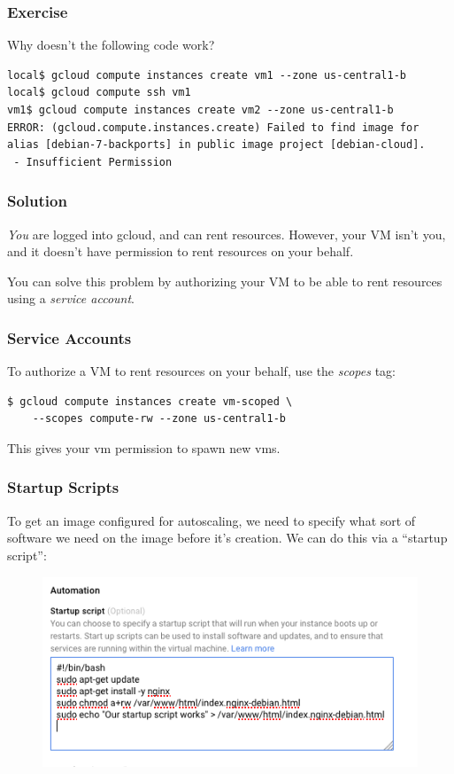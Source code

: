 \documentclass[9pt]{beamer}
\begin{document}
\begin{frame}[fragile]
\frametitle{Exercise}
Why doesn't the following code work?
\begin{verbatim}
local$ gcloud compute instances create vm1 --zone us-central1-b
local$ gcloud compute ssh vm1
vm1$ gcloud compute instances create vm2 --zone us-central1-b
ERROR: (gcloud.compute.instances.create) Failed to find image for alias [debian-7-backports] in public image project [debian-cloud].
 - Insufficient Permission
\end{verbatim}
\end{frame}

\begin{frame}[fragile]
\frametitle{Solution}
\emph{You} are logged into gcloud, and can rent resources. However, your VM isn't you, and it doesn't have permission to rent resources on your behalf.

You can solve this problem by authorizing your VM to be able to rent resources using a \emph{service account}.
\end{frame}

\begin{frame}[fragile]
\frametitle{Service Accounts}
To authorize a VM to rent resources on your behalf, use the \emph{scopes} tag:
\begin{verbatim}
$ gcloud compute instances create vm-scoped \
    --scopes compute-rw --zone us-central1-b
\end{verbatim}
This gives your vm permission to spawn new vms.
\end{frame}

\begin{frame}[fragile]
  \frametitle{Startup Scripts}
  To get an image configured for autoscaling, we need to specify what sort of software we need on the image before it's creation. We can do this via a ``startup script'':
  \begin{figure}
    \includegraphics[scale=0.5]{figures/StartupScript.png}
  \end{figure}
\end{frame}
\end{document}
